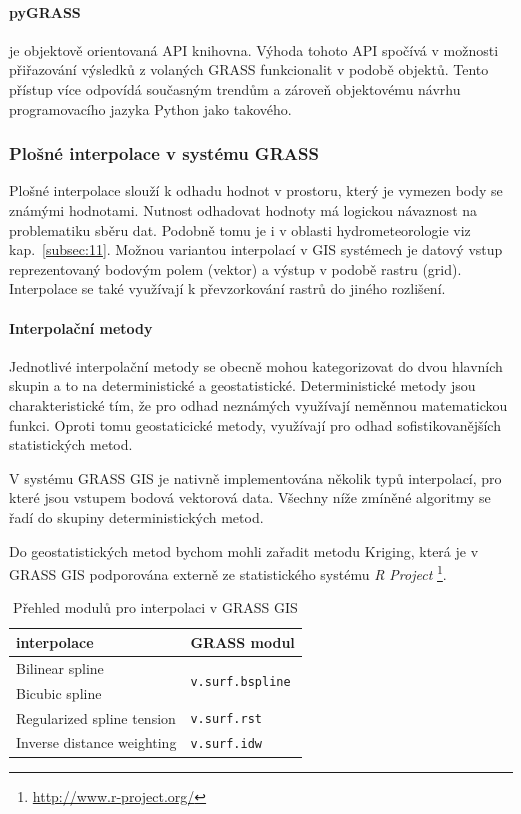 \documentclass[a4paper,12pt,oneside]{report}
\begin{document}
\paragraph*{pyGRASS} je objektově orientovaná API knihovna. Výhoda
tohoto API spočívá v možnosti přiřazování výsledků z volaných GRASS
funkcionalit v podobě objektů. Tento přístup více odpovídá současným trendům a zároveň objektovému návrhu programovacího jazyka Python jako takového.

\subsubsection*{Plošné interpolace v systému GRASS }
\label{sec:plostneinterpolace}
Plošné interpolace slouží k odhadu hodnot v prostoru, který je vymezen 
body se známými hodnotami. Nutnost odhadovat hodnoty má logickou návaznost na
problematiku sběru dat.  Podobně tomu je i v oblasti
hydrometeorologie viz kap.~\ref{subsec:11}.
 Možnou variantou interpolací v GIS
systémech je datový vstup reprezentovaný bodovým polem (vektor) a
výstup v podobě rastru (grid). Interpolace se také využívají k
převzorkování rastrů do jiného rozlišení.

\paragraph*{ Interpolační metody}
Jednotlivé interpolační metody se obecně mohou kategorizovat do dvou
hlavních skupin a to na deterministické a geostatistické.
Deterministické metody jsou charakteristické tím, že pro odhad
neznámých využívají neměnnou matematickou funkci.  Oproti tomu
geostaticické metody, využívají pro odhad sofistikovanějších statistických metod.

V systému GRASS GIS je nativně implementována několik typů
interpolací, pro které jsou vstupem bodová vektorová data. Všechny
níže zmíněné algoritmy se řadí do skupiny deterministických metod.

Do geostatistických metod bychom mohli zařadit metodu Kriging, která
je v GRASS GIS podporována externě ze statistického systému \textit{R
  Project} \footnote{\url{http://www.r-project.org/}}.

\begin{table}[h]
\centering
\begin{tabular}{|ll|}
\hline
interpolace & GRASS modul \\ \hline\hline
Bilinear spline & \multirow{2}{*}{{\tt v.surf.bspline}} \\
Bicubic spline &  \\
Regularized spline tension & {\tt v.surf.rst} \\
Inverse distance weighting & {\tt v.surf.idw} \\ \hline
\end{tabular}
\caption{Přehled modulů pro interpolaci v GRASS GIS}
\label{my-label}
\end{table}
\end{document}
